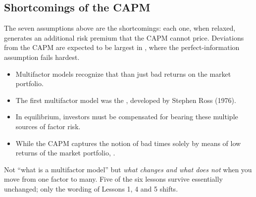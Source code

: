 \subsection{Shortcomings of the CAPM}

The seven assumptions above are the shortcomings: each one, when relaxed,
generates an additional risk premium that the CAPM cannot price. Deviations from
the CAPM are expected to be largest in ,
where the perfect-information assumption fails hardest.


\begin{itemize}
\item Multifactor models recognize that  than just bad returns on the market portfolio.
\item The first multifactor model was the ,
developed by Stephen Ross (1976).
\item In equilibrium, investors must be compensated for bearing these multiple
sources of factor risk.
\item While the CAPM captures the notion of bad times solely by means of low
returns of the market portfolio, .
\end{itemize}

\gapbadge
{}

\begin{imgapbox}[title={What the objective asks for}]
Not ``what is a multifactor model'' but \emph{what changes and what does not}
when you move from one factor to many. Five of the six lessons survive
essentially unchanged; only the wording of Lessons 1, 4 and 5 shifts.
\end{imgapbox}

